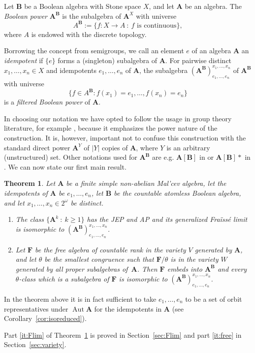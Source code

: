 \documentclass[12pt,a4paper,reqno]{amsart}
\numberwithin{equation}{section}
\theoremstyle{plain}
\newtheorem{thm}{Theorem}[section]
\theoremstyle{definition}
\newcommand{\A}{\mathbf{A}}
\newcommand{\ABxe}{(\mathbf{A^B})^{x_1,\dots,x_n}_{e_1,\dots,e_n}}
\newcommand{\B}{\mathbf{B}}
\newcommand{\F}{\mathbf{F}}
\DeclareMathOperator{\Aut}{Aut}
\newcommand{\st}{\: :\:}
\begin{document}
Let $\B$ be a Boolean algebra with Stone space $X$, and let $\A$ be an algebra. 
The \emph{Boolean power} $\A^\B$ is the subalgebra of $\A^X$ with universe
 \[ A^\B := \{ f\colon X\to A \st f \text{ is continuous} \}, \]
 where $A$ is endowed with the discrete topology.

 Borrowing the concept from semigroups, we call an element $e$ of an algebra $\A$ an \emph{idempotent}
 if $\{e\}$ forms a (singleton) subalgebra of $\A$.  
 For pairwise distinct $x_1,\dots,x_n \in X$ and idempotents $e_1,\dots,e_n$ of $\A$,
the subalgebra $\ABxe$ of $\A^\B$ with universe
\[ \{ f\in A^\B \colon f(x_1)=e_1,\dots,f(x_n)=e_n \} \]
 is a \emph{filtered Boolean power} of $\A$. 
 
 In choosing our notation we have opted to follow the usage in group theory literature, for example \cite{Ap:BPG,BE:SIP,BG:ARFG}, because it emphasizes the power nature of the construction. It is, however, important not to confuse this construction with the standard direct power $\A^Y$ of $|Y|$ copies of $\A$, where $Y$ is an arbitrary (unstructured) set.
 Other notations used for $\A^\B$ are e.g.  $\A[\B]$ in \cite{Bu:BP,Ev:EAC} or $\A[\B]*$ in \cite{BS:CUA}.
 We can now state our first main result.

\begin{thm} \label{thm:Flim}
 Let $\A$ be a finite simple non-abelian Mal'cev 
 algebra, let the idempotents of $\A$ be $e_1,\dots,e_n$,
let $\B$ be the countable atomless Boolean algebra,
and let $x_1,\dots,x_n\in 2^\omega$ be distinct.
\begin{enumerate}
\item \label{it:Flim}
The class $\{\A^k\st k\geq 1\}$ has the JEP and AP and its generalized Fra{\"i}ss{\'e} limit is isomorphic to $\ABxe$.
\item \label{it:free}
 Let $\F$ be the free algebra of countable rank in the variety $V$ generated by $\A$, and let $\theta$ be the smallest
 congruence such that $\F/\theta$ is in the variety $W$ generated by all proper subalgebras of~$\A$.
 Then $\F$ embeds into $\A^\B$ and every $\theta$-class which is a subalgebra of $\F$ is isomorphic to
 $\ABxe$.
\end{enumerate}  
\end{thm}

 In the theorem above it is in fact sufficient to take $e_1,\dots,e_n$ to be a set of orbit representatives under $\Aut\A$ for
 the idempotents in $\A$ (see Corollary~\ref{cor:isoreduced}).
 
 Part \eqref{it:Flim}  of Theorem~\ref{thm:Flim} is proved in Section~\ref{sec:Flim} and 
 part \eqref{it:free} in Section~\ref{sec:variety}.
\end{document}
